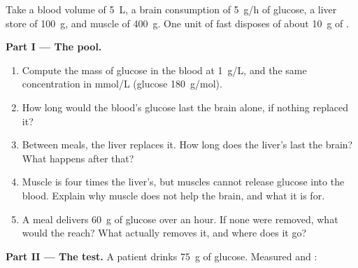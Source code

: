 \begin{problem}
\label{pb:g12:glucose-and-diabetes:1}
Take a blood volume of \qty{5}{L}, a brain consumption of
\qty{5}{g/h} of glucose, a liver  store of \qty{100}{g}, and
muscle  of \qty{400}{g}. One unit of fast  disposes of
about \qty{10}{g} of .

\medskip
\noindent\textbf{Part I --- The pool.}
\begin{enumerate}
  \item Compute the mass of glucose in the blood at \qty{1}{g/L}, and
        the same concentration in \unit{mmol/L} (glucose
        \qty{180}{g/mol}).
  \item How long would the blood's glucose last the brain alone, if
        nothing replaced it?
  \item Between meals, the liver replaces it. How long does the
        liver's  last the brain? What happens after that?
  \item Muscle  is four times the liver's, but muscles cannot
        release glucose into the blood. Explain why muscle 
        does not help the brain, and what it is for.
  \item A meal delivers \qty{60}{g} of glucose over an hour. If none
        were removed, what would the  reach? What actually
        removes it, and where does it go?
\end{enumerate}

\medskip
\noindent\textbf{Part II --- The test.}
A patient drinks \qty{75}{g} of glucose. Measured  and
:


\end{problem}
